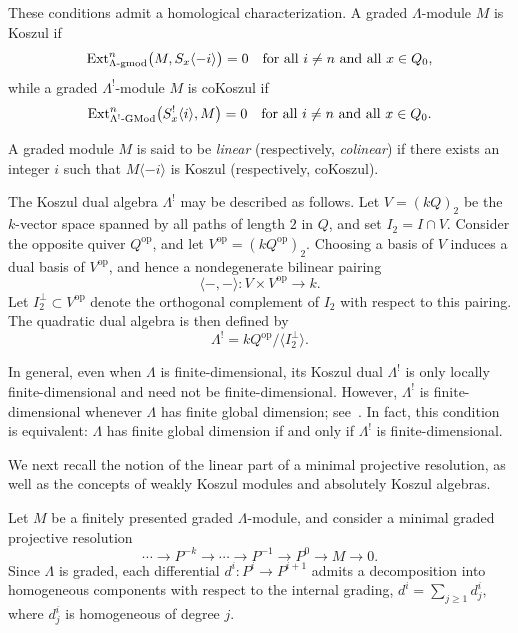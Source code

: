 \documentclass[11pt]{article}
\theoremstyle{definition}
\theoremstyle{remark}
\begin{document}
These conditions admit a homological characterization. A graded $\Lambda$-module $M$ is Koszul if
\[
\operatorname{Ext}^n_{\Lambda\textup{-gmod}}\bigl(M, S_x\langle -i\rangle\bigr)=0
\quad \text{for all } i \neq n \text{ and all } x \in Q_0,
\]
while a graded $\Lambda^{!}$-module $M$ is coKoszul if
\[
\operatorname{Ext}^n_{\Lambda^{!}\textup{-GMod}}\bigl(S^{!}_x\langle i\rangle, M\bigr)=0
\quad \text{for all } i \neq n \text{ and all } x \in Q_0.
\]

A graded module $M$ is said to be \emph{linear} (respectively, \emph{colinear}) if there exists an integer $i$ such that $M\langle -i\rangle$ is Koszul (respectively, coKoszul).

\medskip

The Koszul dual algebra $\Lambda^{!}$ may be described as follows. Let $V=(kQ)_2$ be the $k$-vector space spanned by all paths of length $2$ in $Q$, and set $I_2 = I \cap V$. Consider the opposite quiver $Q^{\mathrm{op}}$, and let $V^{\mathrm{op}} = (kQ^{\mathrm{op}})_2$. Choosing a basis of $V$ induces a dual basis of $V^{\mathrm{op}}$, and hence a nondegenerate bilinear pairing
\[
\langle -,- \rangle \colon V \times V^{\mathrm{op}} \longrightarrow k.
\]
Let $I_2^{\perp} \subset V^{\mathrm{op}}$ denote the orthogonal complement of $I_2$ with respect to this pairing. The quadratic dual algebra is then defined by
\[
\Lambda^{!} = kQ^{\mathrm{op}} \big/ \langle I_2^{\perp} \rangle.
\]

In general, even when $\Lambda$ is finite-dimensional, its Koszul dual $\Lambda^{!}$ is only locally finite-dimensional and need not be finite-dimensional. However, $\Lambda^{!}$ is finite-dimensional whenever $\Lambda$ has finite global dimension; see~\cite[Theorem~2.6]{4}. In fact, this condition is equivalent: $\Lambda$ has finite global dimension if and only if $\Lambda^{!}$ is finite-dimensional.

\medskip

We next recall the notion of the linear part of a minimal projective resolution, as well as the concepts of weakly Koszul modules and absolutely Koszul algebras.

Let \(M\) be a finitely presented graded \(\Lambda\)-module, and consider a minimal graded projective resolution
\[
\cdots \longrightarrow P^{-k} \longrightarrow \cdots \longrightarrow P^{-1} \longrightarrow P^{0} \longrightarrow M \longrightarrow 0.
\]
Since \(\Lambda\) is graded, each differential \(d^{i}\colon P^{i}\to P^{i+1}\) admits a decomposition into homogeneous components with respect to the internal grading,
\( 
d^{i}=\sum_{j\ge 1} d^{i}_{j},
\)
where \(d^{i}_{j}\) is homogeneous of degree \(j\).
\end{document}
